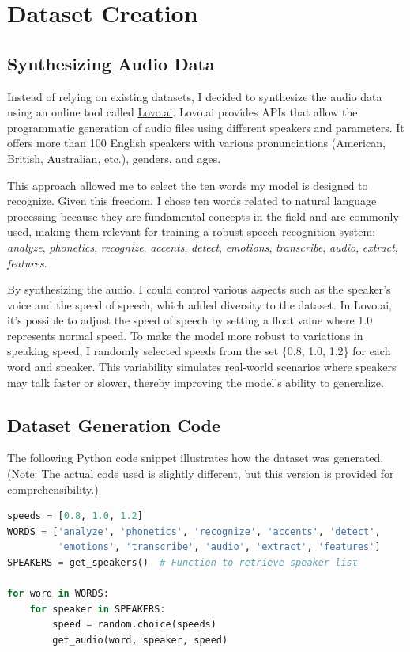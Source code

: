 \documentclass[12pt]{article}
\begin{document}
\section{Dataset Creation}

\subsection{Synthesizing Audio Data}

Instead of relying on existing datasets, I decided to synthesize the audio data using an online tool called \href{https://lovo.ai}{Lovo.ai}. Lovo.ai provides APIs that allow the programmatic generation of audio files using different speakers and parameters. It offers more than 100 English speakers with various pronunciations (American, British, Australian, etc.), genders, and ages.

This approach allowed me to select the ten words my model is designed to recognize. Given this freedom, I chose ten words related to natural language processing because they are fundamental concepts in the field and are commonly used, making them relevant for training a robust speech recognition system: \textit{analyze}, \textit{phonetics}, \textit{recognize}, \textit{accents}, \textit{detect}, \textit{emotions}, \textit{transcribe}, \textit{audio}, \textit{extract}, \textit{features}.

By synthesizing the audio, I could control various aspects such as the speaker's voice and the speed of speech, which added diversity to the dataset. In Lovo.ai, it's possible to adjust the speed of speech by setting a float value where 1.0 represents normal speed. To make the model more robust to variations in speaking speed, I randomly selected speeds from the set \{0.8, 1.0, 1.2\} for each word and speaker. This variability simulates real-world scenarios where speakers may talk faster or slower, thereby improving the model's ability to generalize.

\subsection{Dataset Generation Code}

The following Python code snippet illustrates how the dataset was generated. (Note: The actual code used is slightly different, but this version is provided for comprehensibility.)

\begin{lstlisting}[language=Python, caption=Dataset Generation Script]
speeds = [0.8, 1.0, 1.2]
WORDS = ['analyze', 'phonetics', 'recognize', 'accents', 'detect',
         'emotions', 'transcribe', 'audio', 'extract', 'features']
SPEAKERS = get_speakers()  # Function to retrieve speaker list

for word in WORDS:
    for speaker in SPEAKERS:
        speed = random.choice(speeds)
        get_audio(word, speaker, speed)
\end{lstlisting}
\end{document}
